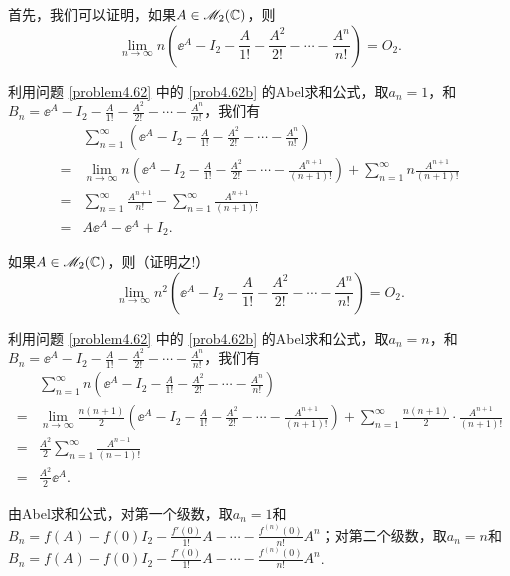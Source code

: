 \begin{solution}
  \begin{inparaenum}[(a)]
    \item 首先，我们可以证明，如果$A\in\mathscr M_2(\mathbb C)$，则
    \[
      \lim_{n\to\infty} n\left( \ee^A - I_2 - \frac A{1!} - \frac{A^2}{2!} - \cdots - \frac{A^n}{n!} \right) = O_2.
    \]

    利用问题 \ref{problem4.62} 中的 \ref{prob4.62b} 的Abel求和公式，取$a_n=1$，和$B_n=\ee^A- I_2 - \frac A{1!} - \frac{A^2}{2!} - \cdots - \frac{A^n}{n!}$，我们有
    \begin{align*}
      &\sum_{n=1}^\infty \left( \ee^A - I_2 - \frac A{1!} - \frac{A^2}{2!} - \cdots - \frac{A^n}{n!} \right) \\
      = {}& \lim_{n\to\infty} n \left( \ee^A - I_2 - \frac A{1!} - \frac{A^2}{2!} - \cdots - \frac{A^{n+1}}{(n+1)!} \right) + \sum_{n=1}^\infty n \frac{A^{n+1}}{(n+1)!} \\
      = {}& \sum_{n=1}^\infty \frac{A^{n+1}}{n!} - \sum_{n=1}^\infty \frac{A^{n+1}}{(n+1)!} \\
      = {}& A\ee^A - \ee^A + I_2.
    \end{align*}

    \item 如果$A\in\mathscr M_2(\mathbb C)$，则（证明之!）
    \[
      \lim_{n\to\infty} n^2\left( \ee^A - I_2 - \frac A{1!} - \frac{A^2}{2!} - \cdots - \frac{A^n}{n!} \right) = O_2.
    \]

    利用问题 \ref{problem4.62} 中的 \ref{prob4.62b} 的Abel求和公式，取$a_n=n$，和$B_n=\ee^A- I_2 - \frac A{1!} - \frac{A^2}{2!} - \cdots - \frac{A^n}{n!}$，我们有
    \begin{align*}
      & \sum_{n=1}^\infty n\left( \ee^A - I_2 - \frac A{1!} - \frac{A^2}{2!} - \cdots - \frac{A^n}{n!} \right) \\
      = {}&  \lim_{n\to\infty} \frac{n(n+1)}2 \left( \ee^A - I_2 - \frac A{1!} - \frac{A^2}{2!} - \cdots - \frac{A^{n+1}}{(n+1)!} \right) + \sum_{n=1}^\infty \frac{n(n+1)}2 \cdot  \frac{A^{n+1}}{(n+1)!} \\
      = {}& \frac{A^2}2 \sum_{n=1}^\infty \frac{A^{n-1}}{(n-1)!} \\
      = {}& \frac{A^2}2\ee^A.
    \end{align*}
  \end{inparaenum}
\end{solution}

\setcounter{solution}{72}

\begin{solution}
  由Abel求和公式，对第一个级数，取$a_n=1$和$B_n=f(A)-f(0)I_2-\frac{f'(0)}{1!}A-\cdots-\frac{f^{(n)}(0)}{n!}A^n$；对第二个级数，取$a_n=n$和$B_n=f(A)-f(0)I_2-\frac{f'(0)} {1!}A-\cdots-\frac{f^{(n)}(0)}{n!}A^n$.
\end{solution}

